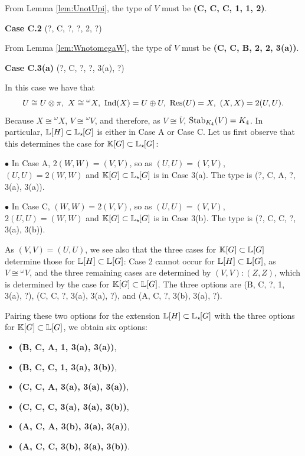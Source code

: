 From Lemma \ref{lem:UnotUpi}, the type of $V$ must be \textbf{(C, C, C, 1, 1, 2)}.

\vspace{0.5em}
\noindent \textbf{Case C.2} (?, C, ?, ?, 2, ?)

From Lemma \ref{lem:WnotomegaW}, the type of $V$ must be \textbf{(C, C, B, 2, 2, 3(a))}.

\vspace{0.5em}
\noindent \textbf{Case C.3(a)} (?, C, ?, ?, 3(a), ?)

In this case we have that
\[
U \cong U \otimes \pi, \ X \cong {}^{\omega} X, \ \Ind(X) = U \oplus U, \ \Res(U) = X, \ (X,X) = 2(U,U).
\]
Because $X \cong {}^{\omega} X$, $V \cong {}^{\omega} V$, and therefore, as $V \cong \overline{V}$, $\operatorname{Stab}_{K_4}(V) = K_4$. In particular, ${\mathbb L}[H] \subset {\mathbb L}_{\star \hspace{-0.1em}}[G]$ is either in Case A or Case C. Let us first observe that this determines the case for ${\mathbb K}[G] \subset {\mathbb L}_{\star \hspace{-0.1em}}[G]$: 

$\bullet$ In Case A, $2(W,W) = (V,V)$, so as $(U,U) = (V,V)$, $(U,U) = 2 (W,W)$ and ${\mathbb K}[G] \subset {\mathbb L}_{\star \hspace{-0.1em}}[G]$ is in Case 3(a). The type is (?, C, A, ?, 3(a), 3(a)).

$\bullet$ In Case C, $(W,W) = 2 (V,V)$, so as $(U,U) = (V,V)$, $2(U,U) = (W,W)$ and ${\mathbb K}[G] \subset {\mathbb L}_{\star \hspace{-0.1em}}[G]$ is in Case 3(b). The type is (?, C, C, ?, 3(a), 3(b)).

As $(V,V) = (U,U)$, we see also that the three cases for ${\mathbb K}[G] \subset {\mathbb L}[G]$ determine those for ${\mathbb L}[H] \subset {\mathbb L}[G]$: Case 2 cannot occur for ${\mathbb L}[H] \subset {\mathbb L}[G]$, as $V \cong {}^{\omega}V$, and the three remaining cases are determined by $(V,V):(Z,Z)$, which is determined by the case for ${\mathbb K}[G] \subset {\mathbb L}[G]$. The three options are (B, C, ?, 1, 3(a), ?), (C, C, ?, 3(a), 3(a), ?), and (A, C, ?, 3(b), 3(a), ?).

Pairing these two options for the extension ${\mathbb L}[H] \subset {\mathbb L}_{\star \hspace{-0.1em}}[G]$ with the three options for ${\mathbb K}[G] \subset {\mathbb L}[G]$, we obtain six options:
\begin{itemize}
     \item \textbf{(B, C, A, 1, 3(a), 3(a))},
     \item \textbf{(B, C, C, 1, 3(a), 3(b))},
     \item \textbf{(C, C, A, 3(a), 3(a), 3(a))},
     \item \textbf{(C, C, C, 3(a), 3(a), 3(b))},
     \item \textbf{(A, C, A, 3(b), 3(a), 3(a))},
     \item \textbf{(A, C, C, 3(b), 3(a), 3(b))}.
\end{itemize}

